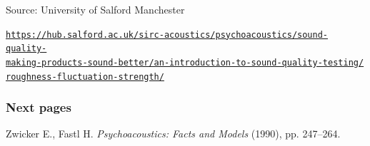 \documentclass{article}
\begin{document}
\bigskip

Source:  University of Salford Manchester 

\noindent \href{https://hub.salford.ac.uk/sirc-acoustics/psychoacoustics/sound-quality-making-products-sound-better/an-introduction-to-sound-quality-testing/roughness-fluctuation-strength/}{\texttt{\small https://hub.salford.ac.uk/sirc-acoustics/psychoacoustics/sound-quality-\\ \noindent making-products-sound-better/an-introduction-to-sound-quality-testing/\\ \noindent roughness-fluctuation-strength/}}

\subsubsection*{Next pages}

Zwicker E., Fastl H. \textit{Psychoacoustics: Facts and Models} (1990), pp. 247--264.


\end{document}
